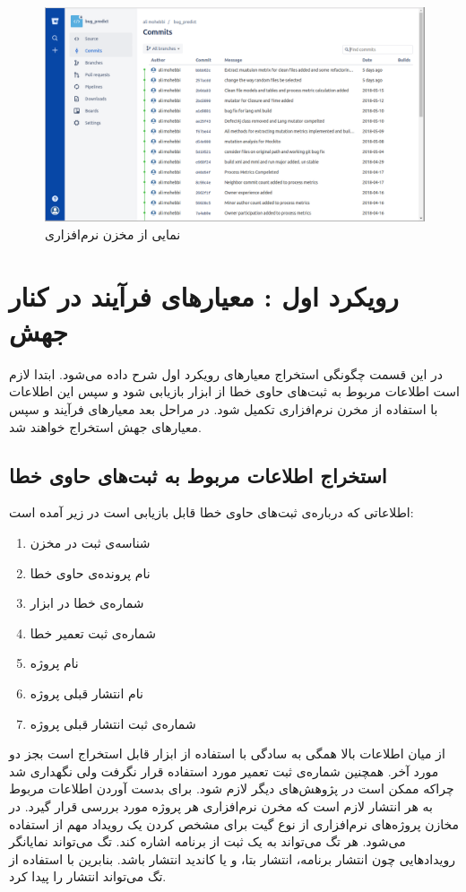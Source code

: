  \begin{figure}[H]
	\centering
	\includegraphics[width=1\textwidth]{img/case_study/bitbucket.png}
	\caption{نمایی از مخزن نرم‌افزاری}
	\label{fig:bitbucket}
\end{figure}



\section{رویکرد اول : معیارهای فرآیند در کنار جهش}
در این قسمت  چگونگی استخراج معیارهای رویکرد اول شرح داده می‌شود. ابتدا لازم است اطلاعات مربوط به ثبت‌های  حاوی خطا از ابزار  بازیابی شود و سپس این اطلاعات با استفاده از مخرن نرم‌افزاری تکمیل شود. در مراحل بعد معیار‌های فرآیند و سپس معیارهای جهش استخراج خواهند شد. 

\subsection{ استخراج اطلاعات مربوط به ثبت‌های   حاوی خطا}
اطلاعاتی که درباره‌ی ثبت‌های حاوی خطا قابل بازیابی است در زیر آمده است:
\begin{enumerate}
\item شناسه‌ی ثبت در مخزن 
\item نام پرونده‌ی حاوی خطا
\item شماره‌ی خطا در ابزار 
\item شماره‌ی ثبت تعمیر خطا
\item نام پروژه
\item نام انتشار قبلی پروژه
\item شماره‌ی ثبت انتشار قبلی پروژه
\end{enumerate}

از میان اطلاعات بالا همگی به سادگی با استفاده از ابزار  قابل استخراج است بجز دو مورد آخر. همچنین شماره‌ی ثبت تعمیر مورد استفاده قرار نگرفت ولی نگهداری شد چراکه ممکن است در پژوهش‌های دیگر لازم شود. 
برای بدست آوردن اطلاعات مربوط به هر انتشار لازم است که مخرن نرم‌افزاری هر پروژه مورد بررسی قرار گیرد. در  مخازن پروژه‌های نرم‌افزاری  از نوع گیت برای مشخص کردن یک رویداد مهم از  استفاده می‌شود. هر تگ می‌تواند به یک ثبت از برنامه اشاره کند. تگ می‌تواند نمایانگر رویدادهایی چون انتشار برنامه، انتشار بتا، و یا کاندید انتشار باشد. بنابرین با استفاده از تگ می‌تواند انتشار را پیدا کرد.\\

